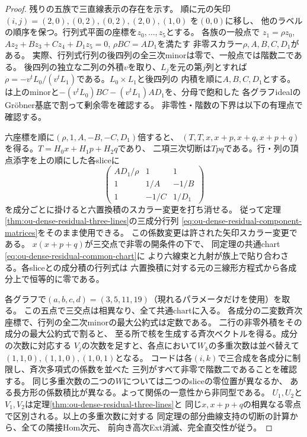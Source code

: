 \begin{proof}
残りの五族で三直線表示の存在を示す。
順に元の矢印 $(i,j)=(2,0),(0,2),(0,2),(2,0),(1,0)$ を$(0,0)$に移し、
他のラベルの順序を保つ。行列式平面の座標を$z_0,\ldots,z_5$とする。
各族の一般点で $z_1=\rho z_0$,
$A z_2+B z_3+C z_4+D_1 z_5=0$, $\rho BC=AD_1$を満たす
非零スカラー$\rho,A,B,C,D_1$がある。
実際、行列式行列の後四列の全三次minorは零で、一般点では階数二である。
後四列の独立な二列の外積$v$を取り、$L_j$を元の第$j$列とすれば
$\rho=-v^tL_0/(v^tL_1)$である。$L_0\times L_1$と後四列の
内積を順に$A,B,C,D_1$とする。
は上のminorと$-(v^t L_0)BC-(v^t L_1)AD_1$を、分母で飽和した
各グラフidealのGröbner基底で割って剰余零を確認する。
非零性・階数の下界は以下の有理点で確認する。

六座標を順に$(\rho,1,A,-B,-C,D_1)$倍すると、
$(T,T,x,x+p,x+q,x+p+q)$を得る。$T=H_0 x+H_1 p+H_2 q$であり、
二項三次切断は$Tpq$である。行・列の頂点添字を上の順にした各sliceに
\[
 \begin{pmatrix}AD_1/\rho&1&1\\1&1/A&-1/B\\1&-1/C&1/D_1\end{pmatrix}
\]
を成分ごとに掛けると六置換積のスカラー変更を打ち消せる。
従って定理\ref{thm:ou-dense-residual-three-lines}の三成分行列
\eqref{eq:ou-dense-residual-component-matrices}をそのまま使用できる。
この係数変更は許された矢印スカラー変更である。
$x(x+p+q)$が三交点で非零の開条件の下で、
同定理の共通chart \eqref{eq:ou-dense-residual-common-chart}に
より六線束と九射が族上で貼り合わさる。各sliceとの成分積の行列式は
六置換積に対する元の三線形方程式から各成分上で恒等的に零である。

各グラフで$(a,b,c,d)=(3,5,11,19)$（現れるパラメータだけを使用）を取る。
この五点で三交点は相異なり、全て共通chartに入る。
各成分の二変数斉次座標で、行列の全二次minorの最大公約式は定数である。
二行の非零外積をその成分の最大公約式で割ると、
至る所で核を生成する斉次ベクトルを得る。成分の次数に対応する
$V_j$の次数を足すと、各点において$W_k$の多重次数は並べ替えて
$(1,1,0),(1,1,0),(1,0,1)$となる。
コードは各$(i,k)$で三合成を各成分に制限し、斉次多項式の係数を並べた
三列がすべて非零で階数二であることを確認する。
同じ多重次数の二つの$W$については二つのsliceの零位置が異なるか、
ある長方形の係数積比が異なる。よって関係の一意性から非同型である。
$U_1,U_2$と$V_1,V_2$は定理\ref{thm:ou-dense-residual-three-lines}と
同じ$x,x+p+q$の相異なる零点で区別される。以上の多重次数に対する
同定理の部分曲線支持の切断の計算から、全ての隣接Hom次元、
前向き高次Ext消滅、完全直交性が従う。


\end{proof}
